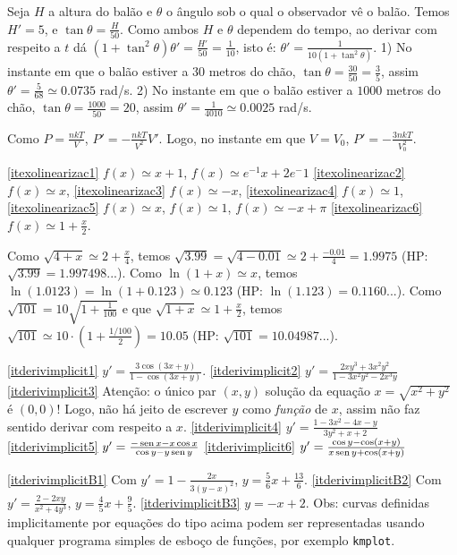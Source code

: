 \begin{Solution}{6.41}
Seja $H$ a altura do balão e $\theta$ o ângulo sob o qual o observador vê o
balão. Temos $H'=5$, e $\tan \theta=\frac{H}{50}$. Como ambos $H$ e
$\theta$ dependem do tempo, ao derivar com respeito a $t$ dá
$(1+\tan^2\theta)\theta'=\frac{H'}{50}=\frac{1}{10}$, isto é:
$\theta'=\frac{1}{10(1+\tan^2\theta)}$.
1) No instante em que o balão estiver a $30$ metros do chão, $\tan
\theta=\frac{30}{50}=\tfrac35$, assim $\theta'=\frac{5}{68}\simeq 0.0735$
rad/s.
2) No instante em que o balão estiver a $1000$ metros do chão, $\tan
\theta=\frac{1000}{50}=20$, assim $\theta'=\frac{1}{4010}\simeq 0.0025$ rad/s.
\end{Solution}
\begin{Solution}{6.42}
Como $P=\frac{nkT}{V}$, $P'=-\frac{nkT}{V^2}V'$. Logo,
no instante em que $V=V_0$,
$P'=-\frac{3nkT}{V_0^2}$.
\end{Solution}
\begin{Solution}{6.43}
\eqref{itexolinearizac1} $f(x)\simeq x+1$, $f(x)\simeq e^{-1}x+2e{^-1}$
\eqref{itexolinearizac2} $f(x)\simeq x$,
\eqref{itexolinearizac3} $f(x)\simeq -x$,
\eqref{itexolinearizac4} $f(x)\simeq 1$,
\eqref{itexolinearizac5} $f(x)\simeq x$, $f(x)\simeq 1$, $f(x)\simeq -x+\pi$
\eqref{itexolinearizac6} $f(x)\simeq 1+\frac{x}{2}$.
\end{Solution}
\begin{Solution}{6.44}
Como $\sqrt{4+x}\simeq 2+\frac{x}{4}$, temos $\sqrt{3.99}=\sqrt{4-0.01}\simeq
2+\frac{-0.01}{4}=1.9975$ (HP: $\sqrt{3.99}=1.997498...$).
Como $\ln (1+x)\simeq x$, temos $\ln(1.0123)=\ln(1+0.123)\simeq 0.123$ (HP:
$\ln(1.123)=0.1160...$).
Como $\sqrt{101}=10\sqrt{1+\frac{1}{100}}$ e que $\sqrt{1+x}\simeq
1+\frac{x}{2}$, temos $\sqrt{101}\simeq 10\cdot(1+\frac{1/100}{2})=10.05$ (HP:
$\sqrt{101}=10.04987...$).
\end{Solution}
\begin{Solution}{6.45}
\eqref{itderivimplicit1} $y'=\frac{3\cos(3x+y)}{1-\cos(3x+y)}$.
\eqref{itderivimplicit2} $y'=\frac{2xy^3+3x^2y^2}{1-3x^2y^2-2x^3y}$
\eqref{itderivimplicit3} Atenção: o único par $(x,y)$ solução da
equação $x=\sqrt{x^2+y^2}$ é $(0,0)$! Logo, não há jeito de escrever $y$ como
\emph{função} de $x$, assim não faz sentido derivar com respeito a $x$.
\eqref{itderivimplicit4} $y'=\frac{1-3x^2-4x-y}{3y^2+x+2}$
\eqref{itderivimplicit5} $y'=\frac{-\operatorname{sen} x-x\cos x}{\cos y-y\operatorname{sen} y}$
\eqref{itderivimplicit6} $y'=\frac{\cos y-\cos(x+y)}{x\operatorname{sen} y+\cos(x+y)}$
\end{Solution}
\begin{Solution}{6.46}
\eqref{itderivimplicitB1} Com $y'=1-\frac{2x}{3(y-x)^2}$,  $y=\frac56
x+\frac{13}{6}$.
\eqref{itderivimplicitB2} Com $y'=\frac{2-2xy}{x^2+4y^3}$, $y=\frac45
x+\frac95$.
\eqref{itderivimplicitB3} $y=-x+2$.
Obs: curvas definidas implicitamente por equações do tipo acima podem ser
representadas usando qualquer programa simples de esboço de funções, por exemplo
\verb|kmplot|.
\end{Solution}

